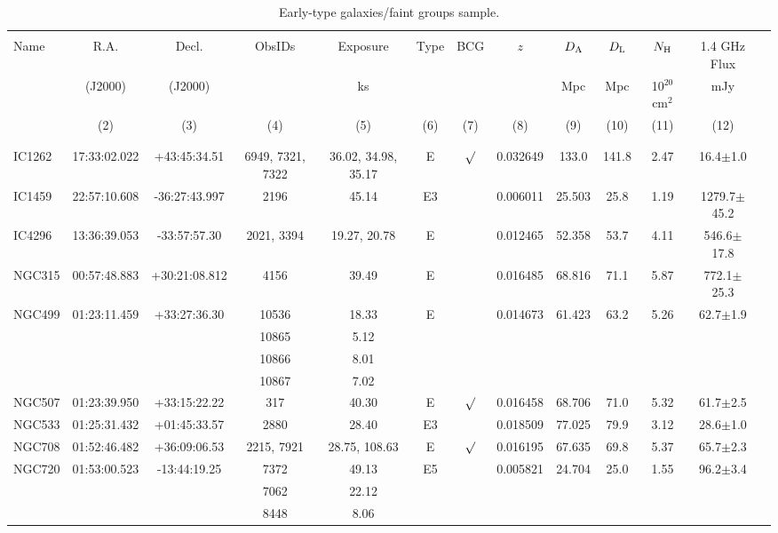 \documentclass[iop]{emulateapj}
\begin{document}
\begin{table}
\caption{Early-type galaxies/faint groups sample.}\label{tab1}
\centering
\begin{tabular}{lcccccccccccc}
\hline
 && \\
Name      & R.A. & Decl. & ObsIDs & Exposure & Type & BCG  &  $z$     &  $D_{\rm A}$ &  $D_{\rm L}$  &  $N_{\rm H}$ & 1.4 GHz Flux \\
          &  (J2000)   & (J2000)    &       &    ks     &      &         &          &   Mpc  &  Mpc    &  10$^{20}$ cm$^{2}$ & mJy \\
          & (2) & (3) & (4) & (5) & (6) & (7) &(8) & (9) & (10) & (11) & (12) \\
&& \\
\hline
&&\\
IC1262  & 17:33:02.022 & +43:45:34.51 & 6949, 7321, 7322 & 36.02, 34.98, 35.17 & E & $\surd$ & 0.032649 & 133.0 & 141.8 & 2.47 & 16.4$\pm$1.0 \\
IC1459  & 22:57:10.608 & -36:27:43.997 & 2196 & 45.14 & E3 & & 0.006011 & 25.503 & 25.8 & 1.19 & 1279.7$\pm$45.2 \\
IC4296  & 13:36:39.053 & -33:57:57.30 & 2021, 3394 & 19.27, 20.78 & E &  & 0.012465 & 52.358 & 53.7 & 4.11 & 546.6$\pm$17.8 \\
NGC315  & 00:57:48.883 & +30:21:08.812 & 4156 & 39.49 & E &         & 0.016485 & 68.816 & 71.1 & 5.87 & 772.1$\pm$25.3 \\
NGC499  & 01:23:11.459 & +33:27:36.30 & 10536 & 18.33 & E & & 0.014673 & 61.423 & 63.2 & 5.26 & 62.7$\pm$1.9 \\
        & && 10865 & 5.12 & \\
        & && 10866 & 8.01 & \\
        & && 10867 & 7.02 & \\
NGC507  & 01:23:39.950 & +33:15:22.22 & 317 & 40.30 & E & $\surd$ & 0.016458 & 68.706 & 71.0 & 5.32 & 61.7$\pm$2.5 \\
NGC533  & 01:25:31.432 & +01:45:33.57 & 2880 & 28.40 & E3 & & 0.018509 & 77.025 & 79.9 & 3.12 & 28.6$\pm$1.0 \\
NGC708  & 01:52:46.482 & +36:09:06.53 &  2215, 7921 & 28.75, 108.63   & E    & $\surd$ & 0.016195 & 67.635 & 69.8  &  5.37 & 65.7$\pm$2.3\\
NGC720  & 01:53:00.523 & -13:44:19.25 & 7372 & 49.13 & E5 &    & 0.005821 & 24.704 & 25.0 & 1.55 & 96.2$\pm$3.4\\
        & && 7062 & 22.12 & \\
        & && 8448 & 8.06 & \\

\end{tabular}
\end{table}
\end{document}
